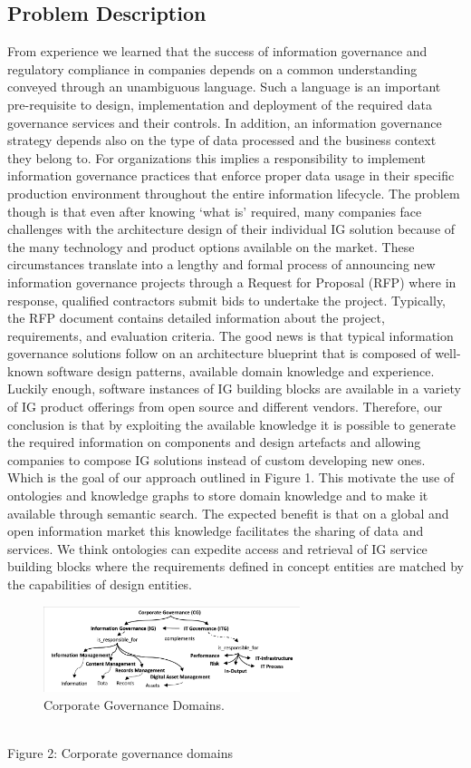 \subsection{Problem Description}
From experience we learned that the success of information governance and regulatory compliance in companies depends on a common understanding conveyed through an unambiguous language. Such a language is an important pre-requisite to design, implementation and deployment of the required data governance services and their controls. In addition, an information governance strategy depends also on the type of data processed and the business context they belong to. For organizations this implies a responsibility to implement information governance practices that enforce proper data usage in their specific production environment throughout the entire information lifecycle. 
The problem though is that even after knowing ‘what is’ required, many companies face challenges with the architecture design of their individual IG solution because of the many technology and product options available on the market. 
These circumstances translate into a lengthy and formal process of announcing new information governance projects through a Request for Proposal (RFP) where in response, qualified contractors submit bids to undertake the project. Typically, the RFP document contains detailed information about the project, requirements, and evaluation criteria. 
The good news is that typical information governance solutions follow on an architecture blueprint that is composed of well-known software design patterns, available domain knowledge and experience. Luckily enough, software instances of IG building blocks are available in a variety of IG product offerings from open source and different vendors. Therefore, our conclusion is that by exploiting the available knowledge it is possible to generate the required information on components and design artefacts and allowing companies to compose IG solutions instead of custom developing new ones. Which is the goal of our approach outlined in Figure 1. This motivate the use of ontologies and knowledge graphs to store domain knowledge and to make it available through semantic search. The expected benefit is that on a global and open information market this knowledge facilitates the sharing of data and services. We think ontologies can expedite access and retrieval of IG service building blocks where the requirements defined in concept entities are matched by the capabilities of design entities. 
%
\begin{figure}[h]
  \centering
    \includegraphics[clip, trim=1cm 7cm 0 0 , width=7.5cm]{images/Fig2-CG.Domains.png}
    \caption{Corporate Governance Domains.}
  \label{fig:igdomains}
\end{figure}
\\ Figure 2: Corporate governance domains

